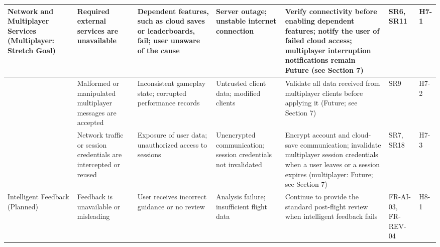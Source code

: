 \documentclass{article}
\newcommand{\reqref}[1]{#1}
\begin{document}
\begin{landscape}
\begin{longtable}{|L{1.9cm}|L{2.6cm}|L{3.0cm}|L{2.8cm}|L{3.8cm}|L{1.9cm}|L{0.8cm}|}
Network and Multiplayer Services (Multiplayer: Stretch Goal) &
Required external services are unavailable &
Dependent features, such as cloud saves or leaderboards, fail; user
unaware of the cause &
Server outage; unstable internet connection &
Verify connectivity before enabling dependent features; notify the user of
failed cloud access; multiplayer interruption notifications remain Future
(see Section 7) &
\reqref{SR6}, \reqref{SR11} &
H7-1 \\
\hline
&
Malformed or manipulated multiplayer messages are accepted &
Inconsistent gameplay state; corrupted performance records &
Untrusted client data; modified clients &
Validate all data received from multiplayer clients before applying it
(Future; see Section 7) &
\reqref{SR9} &
H7-2 \\
\hline
&
Network traffic or session credentials are intercepted or reused &
Exposure of user data; unauthorized access to sessions &
Unencrypted communication; session credentials not invalidated &
Encrypt account and cloud-save communication; invalidate multiplayer session
credentials when a user leaves or a session expires (multiplayer: Future; see Section 7) &
\reqref{SR7}, \reqref{SR18} &
H7-3 \\
\hline

Intelligent Feedback (Planned) &
Feedback is unavailable or misleading &
User receives incorrect guidance or no review &
Analysis failure; insufficient flight data &
Continue to provide the standard post-flight review when intelligent feedback
fails &
FR-AI-03, FR-REV-04 &
H8-1 \\
\hline


\end{longtable}
\end{landscape}
\end{document}
